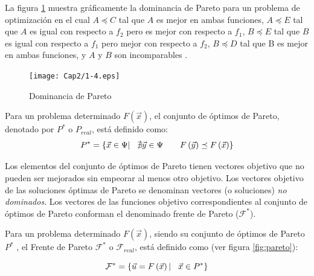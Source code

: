       La figura \ref{fig:paretodominance} muestra gr\'aficamente la dominancia de Pareto para un problema de optimizaci\'on
      \DIFdelbegin {}\DIFdelend \DIFaddbegin {}\DIFaddend en el cual $A \preceq C$ tal que $A$ es mejor en ambas funciones, $A \preceq E$ tal que $A$ es igual con respecto 
      a $f_2$ pero es mejor con respecto a $f_1$, $B \preceq E$ tal que $B$  es igual con respecto a $f_1$ pero mejor con respecto a 
      $f_2$, $B\preceq D$ tal que B es mejor en ambas funciones, y $A$ y $B$ son incomparables\DIFdelbegin {}%
\DIFdelend .

       \begin{figure}
	\centering
	\DIFdelbeginFL %
\DIFdelendFL \DIFaddbeginFL \texttt{[image: Cap2/1-4.eps]}
	  \DIFaddendFL \caption{Dominancia de Pareto}
      \label{fig:paretodominance}
      \end{figure}

      \begin{definicion}
	Para un problema \DIFdelbegin {}\DIFdelend \DIFaddbegin {}\DIFaddend determinado $F\left(\vec{x}\right)$, el conjunto de \'optimos de Pareto, denotado por $P^*$ 
	o $P_{real}$, est\'a definido como:	
	\[
	P^*= \left\{ \vec{x} \in \Psi |\hspace{0.3cm} \nexists \vec{y}\in \Psi \hspace{0.7cm} F\left(\vec{y}\right)\preceq F\left(\vec{x}\right) \right\}\]
      \end{definicion}

      Los elementos del conjunto de \'optimos de Pareto tienen vectores objetivo que no pueden ser mejorados sin empeorar al menos otro
      objetivo. Los vectores objetivo de las soluciones \'optimas de Pareto se denominan vectores (o soluciones) \textit{no dominados}.
      Los vectores de las funciones objetivo correspondientes al conjunto de \'optimos de Pareto conforman el denominado frente de Pareto 
      ($\mathcal{F}^*$).

      \begin{definicion}
      Para un problema \DIFdelbegin {}\DIFdelend \DIFaddbegin {}\DIFaddend determinado $F\left(\vec{x} \right)$, siendo su conjunto de \'optimos de Pareto\DIFdelbegin \DIFdel{(}\DIFdelend \DIFaddbegin \DIFadd{, }\DIFaddend $P^*$ \DIFdelbegin \DIFdel{) }\DIFdelend , el Frente 
      de Pareto $\mathcal{F}^*$ o $\mathcal{F}_{real}$, est\'a definido como (ver figura \ref{fig:pareto}):

	  \[\mathcal{F}^*=\left\{ \vec{u} = F\left(\vec{x}\right) | \hspace{0.3cm} \vec{x}\in P^*\right\}\]
      \end{definicion}

